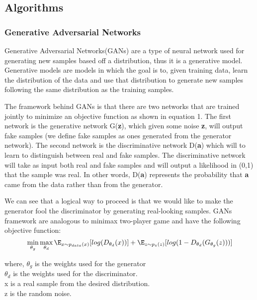 \documentclass[letterpaper]{article}
\begin{document}
\subsection{Algorithms}
\subsubsection{Generative Adversarial Networks}
Generative Adversarial Networks(GANs) are a type of neural network used for generating new samples based off a distribution, thus it is a generative model.
Generative models are models in which the goal is to, given training data, learn the distribution of the data and use that distribution to generate new samples following the same distribution as the training samples.
\par
The framework behind GANs is that there are two networks that are trained jointly to minimize an objective function as shown in equation 1.
The first network is the generative network G(\textbf{z}), which given some noise \textbf{z}, will output fake samples (we define fake samples as ones generated from the generator network).
The second network is the discriminative network D(\textbf{a}) which will to learn to distinguish between real and fake samples. 
The discriminative network will take as input both real and fake samples and will output a likelihood in (0,1) that the sample was real. 
In other words, D(\textbf{a}) represents the probability that \textbf{a} came from the data rather than from the generator. 

We can see that a logical way to proceed is that we would like to make the generator fool the discriminator by generating real-looking samples.
GANs framework are analogous to minimax two-player game and have the following objective function:
\begin{equation}\label{eq:1}
    \min_{\theta_g}\max_{\theta_d} \E_{x{\sim}p_{data}(x)}[log(D_{\theta_d}(x))] \\ +
     \E_{z{\sim}p_{z}(z)}[log(1-D_{\theta_d}(G_{\theta_g}(z)))]
\end{equation}

where, \newline
\null\quad\quad\quad\quad \( \theta_g \) is the weights used for the generator\\ \null\quad\quad\quad\quad \( \theta_d \) is the weights used for the discriminator. \\
\null\quad\quad\quad\quad x is a real sample from the desired distribution. \\
\null\quad\quad\quad\quad z is the random noise. \\
\end{document}

